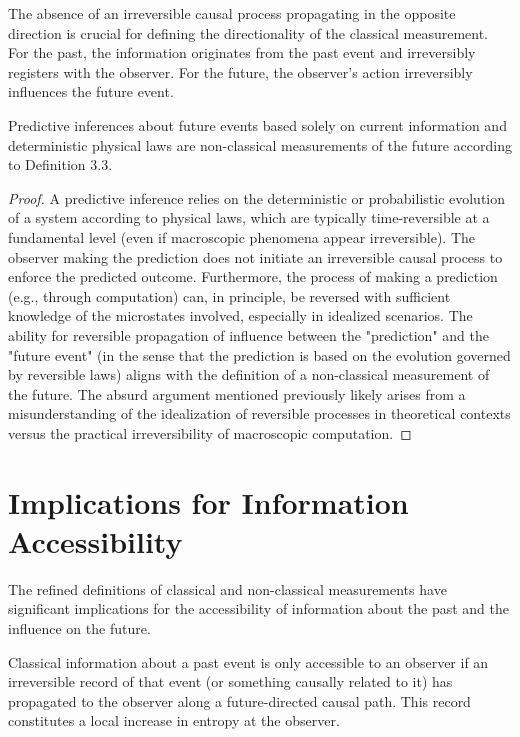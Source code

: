 	\begin{remark}
		The absence of an irreversible causal process propagating in the opposite direction is crucial for defining the directionality of the classical measurement. For the past, the information originates from the past event and irreversibly registers with the observer. For the future, the observer's action irreversibly influences the future event.
	\end{remark}
	
	\begin{proposition}
		Predictive inferences about future events based solely on current information and deterministic physical laws are non-classical measurements of the future according to Definition 3.3.
		\begin{proof}
			A predictive inference relies on the deterministic or probabilistic evolution of a system according to physical laws, which are typically time-reversible at a fundamental level (even if macroscopic phenomena appear irreversible). The observer making the prediction does not initiate an irreversible causal process to enforce the predicted outcome. Furthermore, the process of making a prediction (e.g., through computation) can, in principle, be reversed with sufficient knowledge of the microstates involved, especially in idealized scenarios. The ability for reversible propagation of influence between the "prediction" and the "future event" (in the sense that the prediction is based on the evolution governed by reversible laws) aligns with the definition of a non-classical measurement of the future. The absurd argument mentioned previously likely arises from a misunderstanding of the idealization of reversible processes in theoretical contexts versus the practical irreversibility of macroscopic computation.
		\end{proof}
	\end{proposition}
	
	\section{Implications for Information Accessibility}
	
	The refined definitions of classical and non-classical measurements have significant implications for the accessibility of information about the past and the influence on the future.
	
	\begin{observation}
		Classical information about a past event is only accessible to an observer if an irreversible record of that event (or something causally related to it) has propagated to the observer along a future-directed causal path. This record constitutes a local increase in entropy at the observer.
	\end{observation}
	
